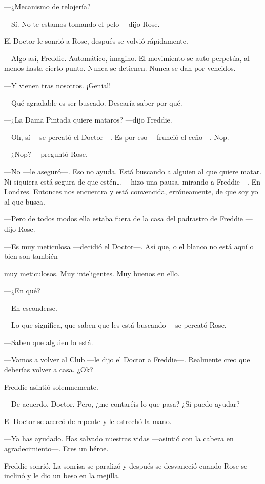 {---¿Mecanismo de relojería?}

{---Sí. No te estamos tomando el pelo ---dijo Rose.}

{El Doctor le sonrió a Rose, después se volvió rápidamente.}

{---Algo así, Freddie. Automático, imagino. El movimiento se
	auto-perpetúa, al menos hasta cierto punto. Nunca se detienen. Nunca se
dan por vencidos.}

{---Y vienen tras nosotros. ¡Genial!}

{---Qué agradable es ser buscado. Desearía saber por qué.}

{---¿La Dama Pintada quiere mataros? ---dijo Freddie.}

{---Oh, sí ---se percató el Doctor---. Es por eso ---frunció el ceño---.
Nop.}

{---¿Nop? ---preguntó Rose.}

{---No ---le aseguró---. Eso no ayuda. Está buscando a alguien al que
	quiere matar. Ni siquiera está segura de que estén\ldots{} ---hizo una
	pausa, mirando a Freddie---. En Londres. Entonces nos encuentra y está
convencida, erróneamente, de que soy yo al que busca.}

{---Pero de todos modos ella estaba fuera de la casa del padrastro de
Freddie ---dijo Rose.}

{---Es muy meticulosa ---decidió el Doctor---. Así que, o el blanco no
está aquí o bien son también}

{muy meticulosos. Muy inteligentes. Muy buenos en ello.}

{---¿En qué?}

{---En esconderse.}

{---Lo que significa, que saben que les está buscando ---se percató
Rose.}

{---Saben que alguien lo está.}

{---Vamos a volver al Club ---le dijo el Doctor a Freddie---. Realmente
creo que deberías volver a casa. ¿Ok?}

{Freddie asintió solemnemente.}

{---De acuerdo, Doctor. Pero, ¿me contaréis lo que pasa? ¿Si puedo
ayudar?}

{El Doctor se acercó de repente y le estrechó la mano.}

{---Ya has ayudado. Has salvado nuestras vidas ---asintió con la cabeza
en agradecimiento---. Eres un héroe.}

{Freddie sonrió. La sonrisa se paralizó y después se desvaneció cuando
Rose se inclinó y le dio un beso en la mejilla.}


